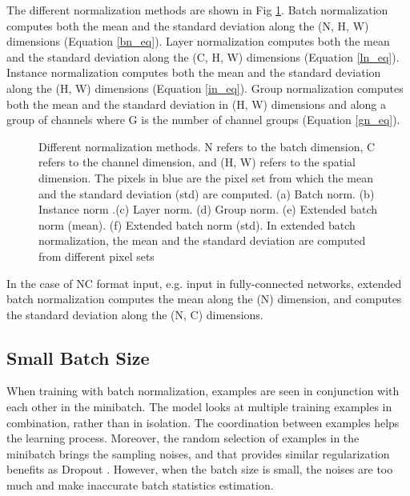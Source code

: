 \documentclass[runningheads]{llncs}
\begin{document}
The different normalization methods are shown in Fig \ref{diffnorm}. Batch normalization computes both the mean and the standard deviation along the (N, H, W) dimensions (Equation \ref{bn_eq}). Layer normalization computes both the mean and the standard deviation along the (C, H, W) dimensions (Equation \ref{ln_eq}).  Instance normalization computes both the mean and the standard deviation along the (H, W) dimensions (Equation \ref{in_eq}). Group normalization computes both the mean and the standard deviation in (H, W) dimensions and along a group of  channels where G is the number of channel groups (Equation \ref{gn_eq}). 






\begin{figure}[tb]
\centering
\subfigure[BN]{
\label{FIGbnset}
\texttt{[image: bn2]}}
\centering
\subfigure[IN]{
\label{FIGlnset}
\texttt{[image: in2]}}
\centering
\subfigure[LN]{
\label{FIGlnset}
\texttt{[image: ln2]}}
\centering
\subfigure[GN]{
\label{FIGgnset}
\texttt{[image: gn2]}}
\centering
{}
\hspace{.3in}
\centering
{}
\caption{Different normalization methods. N refers to the batch dimension, C refers to the channel dimension, and (H, W) refers to the spatial dimension. The pixels in blue are the pixel set from which the  mean and the standard deviation (std) are computed. (a) Batch norm.  (b) Instance norm .(c) Layer norm. (d) Group norm. (e) Extended batch norm (mean). (f) Extended batch norm (std). In extended batch normalization, the mean and the standard deviation are computed from different pixel sets}
\label{diffnorm}
\end{figure}

In the case of NC format input, e.g. input in fully-connected networks, extended batch normalization computes the mean along the (N) dimension, and computes the standard deviation along the (N, C) dimensions.

\subsection{Small Batch Size}
When training with batch normalization, examples are seen in conjunction with each other in the minibatch. The model looks at multiple training examples in combination, rather than in isolation. The coordination between examples helps the learning process. Moreover, the random selection of examples in the minibatch brings the sampling noises, and that provides similar regularization benefits as Dropout \cite{srivastava2014dropout}. However, when the batch size is small, the noises are too much and make inaccurate batch statistics estimation.
\end{document}
